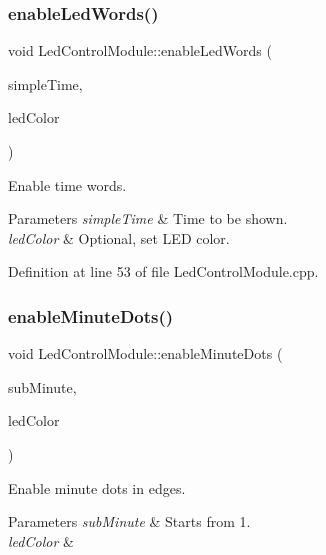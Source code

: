 \subsubsection{\texorpdfstring{enableLedWords()}{enableLedWords()}}
{\footnotesize\ttfamily void Led\+Control\+Module\+::enable\+Led\+Words (\begin{DoxyParamCaption}\item[{const \mbox{\hyperlink{class_simple_time}{Simple\+Time}} \&}]{simple\+Time,  }\item[{const Rgbw\+Color \&}]{led\+Color }\end{DoxyParamCaption})\hspace{0.3cm}{\ttfamily [private]}}



Enable time words. 


\begin{DoxyParams}{Parameters}
{\em simple\+Time} & Time to be shown. \\
\hline
{\em led\+Color} & Optional, set L\+ED color. \\
\hline
\end{DoxyParams}


Definition at line 53 of file Led\+Control\+Module.\+cpp.

\mbox{\label{class_led_control_module_a6c8c6fcd7dc688fb8c14933f418488ed}} 
\subsubsection{\texorpdfstring{enableMinuteDots()}{enableMinuteDots()}}
{\footnotesize\ttfamily void Led\+Control\+Module\+::enable\+Minute\+Dots (\begin{DoxyParamCaption}\item[{int}]{sub\+Minute,  }\item[{const Rgbw\+Color \&}]{led\+Color }\end{DoxyParamCaption})\hspace{0.3cm}{\ttfamily [private]}}



Enable minute dots in edges. 


\begin{DoxyParams}{Parameters}
{\em sub\+Minute} & Starts from 1. \\
\hline
{\em led\+Color} & \\
\hline
\end{DoxyParams}


